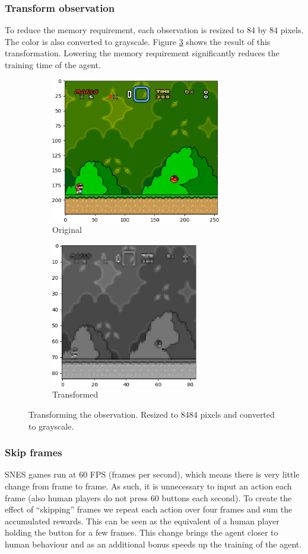 \documentclass[a4paper]{article}
\begin{document}
\subsubsection{Transform observation}
To reduce the memory requirement, each observation is resized to 84 by 84 pixels.
The color is also converted to grayscale.
Figure \ref{fig:transformation} shows the result of this transformation.
Lowering the memory requirement significantly reduces the training time of the agent.
\begin{figure}[htbp]
    \centering
    \begin{subfigure}{.5\textwidth}
        \centering
        \includegraphics[height=6.35cm]{original_crop}
        \caption{Original}
        \label{fig:transformation:sub1}
    \end{subfigure}%
    \begin{subfigure}{.5\textwidth}
        \centering
        \includegraphics[height=6.35cm]{grayscale_crop}
        \caption{Transformed}
        \label{fig:transformation:sub2}
    \end{subfigure}
    \caption{Transforming the observation. Resized to 84\texttimes{}84 pixels and converted to grayscale.}
    \label{fig:transformation}
\end{figure}

\subsubsection{Skip frames}
SNES games run at 60 FPS (frames per second), which means there is very little change from frame to frame.
As such, it is unnecessary to input an action each frame (also human players do not press 60 buttons each second).
To create the effect of ``skipping'' frames we repeat each action over four frames and sum the accumulated rewards.
This can be seen as the equivalent of a human player holding the button for a few frames.
This change brings the agent closer to human behaviour and as an additional bonus speeds up the training of the agent.
\end{document}
